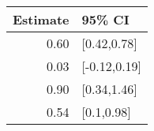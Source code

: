 \begin{tabular}{rl}
  \hline
Estimate & 95\% CI \\ 
  \hline
0.60 & [0.42,0.78] \\ 
  0.03 & [-0.12,0.19] \\ 
  0.90 & [0.34,1.46] \\ 
  0.54 & [0.1,0.98] \\ 
   \hline
\end{tabular}

